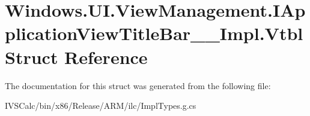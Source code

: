\hypertarget{struct_windows_1_1_u_i_1_1_view_management_1_1_i_application_view_title_bar_____impl_1_1_vtbl}{}\section{Windows.\+U\+I.\+View\+Management.\+I\+Application\+View\+Title\+Bar\+\_\+\+\_\+\+Impl.\+Vtbl Struct Reference}
\label{struct_windows_1_1_u_i_1_1_view_management_1_1_i_application_view_title_bar_____impl_1_1_vtbl}


The documentation for this struct was generated from the following file\+:\begin{DoxyCompactItemize}
\item 
I\+V\+S\+Calc/bin/x86/\+Release/\+A\+R\+M/ilc/Impl\+Types.\+g.\+cs\end{DoxyCompactItemize}
